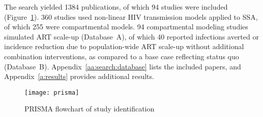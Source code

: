 The search yielded 1384 publications,
of which 94 studies were included
(Figure~\ref{fig:prisma}).
360 studies used non-linear HIV transmission models applied to SSA, of which
255 were compartmental models. 
94 compartmental modeling studies simulated ART scale-up (Database~A), of which
40 reported infections averted or incidence reduction
due to population-wide ART scale-up without additional combination interventions,
as compared to a base case reflecting status quo (Database~B).
Appendix~\ref{aa:search:database} lists the included papers, and
Appendix~\ref{a:results} provides additional results.
\begin{figure}
  \centering
  \texttt{[image: prisma]}
  \caption{PRISMA flowchart of study identification}
  \label{fig:prisma}
\end{figure}
